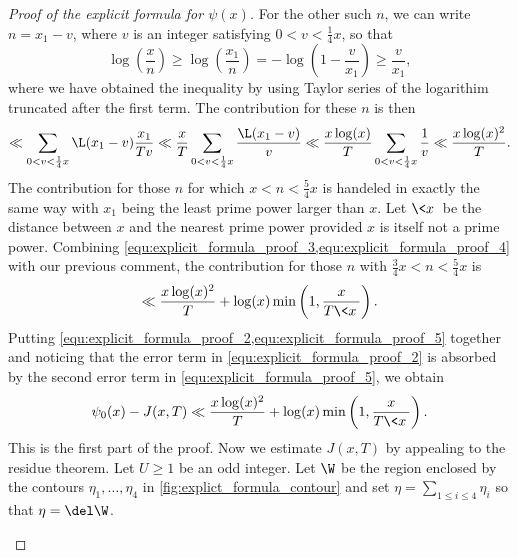\begin{proof}[Proof of the explicit formula for $\psi(x)$]
        For the other such $n$, we can write $n = x_{1}-v$, where $v$ is an integer satisfying $0 < v < \frac{1}{4}x$, so that
        \[
          \log\left(\frac{x}{n}\right) \ge \log\left(\frac{x_{1}}{n}\right) = -\log\left(1-\frac{v}{x_{1}}\right) \ge \frac{v}{x_{1}},
        \]
        where we have obtained the inequality by using Taylor series of the logarithim truncated after the first term. The contribution for these $n$ is then
        \begin{equation}\label{equ:explicit_formula_proof_4}
          \ll \sum_{0 < v < \frac{1}{4}x}\L(x_{1}-v)\frac{x_{1}}{Tv} \ll \frac{x}{T}\sum_{0 < v < \frac{1}{4}x}\frac{\L(x_{1}-v)}{v} \ll \frac{x\log(x)}{T}\sum_{0 < v < \frac{1}{4}x}\frac{1}{v} \ll \frac{x\log(x)^{2}}{T}.
        \end{equation}
        The contribution for those $n$ for which $x < n < \frac{5}{4}x$ is handeled in exactly the same way with $x_{1}$ being the least prime power larger than $x$. Let $\<x\>$ be the distance between $x$ and the nearest prime power provided $x$ is itself not a prime power. Combining \cref{equ:explicit_formula_proof_3,equ:explicit_formula_proof_4} with our previous comment, the contribution for those $n$ with $\frac{3}{4}x < n < \frac{5}{4}x$ is
        \begin{equation}\label{equ:explicit_formula_proof_5}
          \ll \frac{x\log(x)^{2}}{T}+\log(x)\min\left(1,\frac{x}{T\<x\>}\right).
        \end{equation}
        Putting \cref{equ:explicit_formula_proof_2,equ:explicit_formula_proof_5} together and noticing that the error term in \cref{equ:explicit_formula_proof_2} is absorbed by the second error term in \cref{equ:explicit_formula_proof_5}, we obtain
        \begin{equation}\label{equ:explicit_formula_proof_6}
          \psi_{0}(x)-J(x,T) \ll \frac{x\log(x)^{2}}{T}+\log(x)\min\left(1,\frac{x}{T\<x\>}\right).
        \end{equation}
        This is the first part of the proof. Now we estimate $J(x,T)$ by appealing to the residue theorem. Let $U \ge 1$ be an odd integer. Let $\W$ be the region enclosed by the contours $\eta_{1},\ldots,\eta_{4}$ in \cref{fig:explict_formula_contour} and set $\eta = \sum_{1 \le i \le 4}\eta_{i}$ so that $\eta = \del \W$.

        \begin{figure}[ht]
          \centering
\end{figure}
\end{proof}
